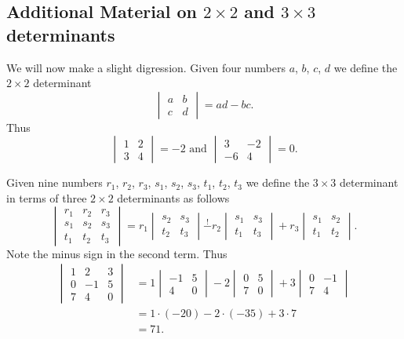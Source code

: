 \subsection{Additional Material on \texorpdfstring{$2\times2$ and $3\times3$}{2x2 and 3x3} determinants}

We will now make a slight digression.  Given four numbers $a$, $b$, $c$, $d$ we define the $2 \times 2$ determinant
\[\begin{vmatrix}a & b \\ c & d\end{vmatrix} = ad - bc.\]
Thus
\[
\begin{vmatrix}1 & 2 \\3 & 4\end{vmatrix} = -2
\text{ and }
\begin{vmatrix}3 & -2 \\-6 & 4\end{vmatrix} = 0.
\]

Given nine numbers $r_1$, $r_2$, $r_3$, $s_1$, $s_2$, $s_3$, $t_1$, $t_2$, $t_3$ we define the $3 \times 3$ determinant in terms of three $2 \times 2$ determinants as follows
\[
\begin{vmatrix}r_1 & r_2 & r_3 \\s_1 & s_2 & s_3 \\t_1 & t_2 & t_3\end{vmatrix} 
=
r_1 \begin{vmatrix}s_2 & s_3 \\t_2 & t_3\end{vmatrix}
\stackrel{!}{-}r_2 \begin{vmatrix}s_1 & s_3 \\t_1 & t_3\end{vmatrix}
+r_3 \begin{vmatrix}s_1 & s_2 \\t_1 & t_2\end{vmatrix}.
\]
Note the minus sign in the second term.  Thus
\begin{align*}
\begin{vmatrix}1 & 2 & 3 \\0 & -1 & 5 \\7 & 4 & 0\end{vmatrix} 
& =
1 \begin{vmatrix}-1 & 5 \\4 & 0\end{vmatrix}
-2 \begin{vmatrix}0 & 5 \\7 & 0\end{vmatrix}
+3 \begin{vmatrix}0 & -1 \\7 & 4\end{vmatrix} \\
& = 1 \cdot (-20) - 2 \cdot (-35) + 3 \cdot 7 \\
& = 71.
\end{align*}

